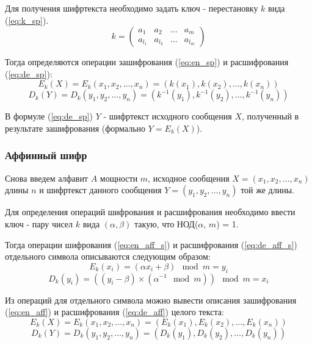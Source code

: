 \documentclass[a4paper]{article}
\begin{document}
  Для получения шифртекста необходимо задать ключ - перестановку $k$ вида (\ref{eq:k_sp}).
  \begin{equation}
    k = \begin{pmatrix}
        a_1 & a_2 & \dots & a_m \\
        a_{l_1} & a_{l_2} & \dots & a_{l_m}
    \end{pmatrix}
    \label{eq:k_sp}
  \end{equation}

  Тогда определяются операции зашифрования (\ref{eq:en_sp}) и расшифрования (\ref{eq:de_sp}):
  \begin{equation}
    E_k(X) = E_k(x_1, x_2, \dots, x_n) = (k(x_1), k(x_2), \dots, k(x_n))
    \label{eq:en_sp}
  \end{equation}
  \begin{equation}
    D_k(Y) = D_k(y_1, y_2, \dots, y_n) = (k^{-1}(y_1), k^{-1}(y_2), \dots, k^{-1}(y_n))
    \label{eq:de_sp}
  \end{equation}

  В формуле (\ref{eq:de_sp}) $Y$ - шифртекст исходного сообщения $X$, полученный в результате
  зашифрования (формально $Y = E_k(X)$).

  \subsubsection{Аффинный шифр}

  Снова введем алфавит $A$ мощности $m$, исходное сообщения $X = (x_1, x_2, \dots, x_n)$ длины $n$
  и шифртекст данного сообщения $Y = (y_1, y_2, \dots, y_n)$ той же длины.

  Для определения операций шифрования и расшифрования необходимо ввести ключ - 
  пару чисел $k$ вида $(\alpha, \beta)$ такую, что НОД($\alpha$, $m$) = 1.

  Тогда операции шифрования (\ref{eq:en_aff_s}) и расшифрования (\ref{eq:de_aff_s}) отдельного символа описываются следующим образом:
  \begin{equation}
    E_k(x_i) = (\alpha x_i + \beta) \mod{m} = y_i
    \label{eq:en_aff_s}
  \end{equation}
  \begin{equation}
    D_k(y_i) = ((y_i - \beta) \times (\alpha^{-1} \mod{m}))\mod{m} = x_i
    \label{eq:de_aff_s}
  \end{equation}

  Из операций для отдельного символа можно вывести описания зашифрования (\ref{eq:en_aff}) и расшифрования (\ref{eq:de_aff}) целого текста:
  \begin{equation}
    E_k(X) = E_k(x_1, x_2, \dots, x_n) = (E_k(x_1), E_k(x_2), \dots, E_k(x_n))
    \label{eq:en_aff}
  \end{equation}
  \begin{equation}
    D_k(Y) = D_k(y_1, y_2, \dots, y_n) = (D_k(y_1), D_k(y_2), \dots, D_k(y_n))
    \label{eq:de_aff}
  \end{equation}
\end{document}
